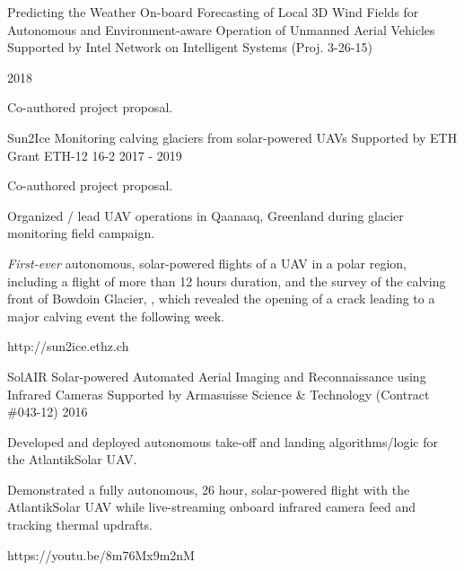 \begin{cventries}
  \cvprojwideentry
  	{Predicting the Weather} %
  	{On-board Forecasting of Local 3D Wind Fields for Autonomous and
Environment-aware Operation of Unmanned Aerial Vehicles} %
    {Supported by Intel Network on Intelligent Systems (Proj. 3-26-15)} %
    {\parbox{\linewidth}{2018\linebreak}} %
    {
      \begin{cvitems} %
        \item {Co-authored project proposal.}
      \end{cvitems}
    } %
    {} %
    {\showprojectdescriptions}
    {}

\vspace{-9pt}

  \cvprojwideentry
  	{Sun2Ice} %
  	{Monitoring calving glaciers from solar-powered UAVs} %
    {Supported by ETH Grant ETH-12 16-2} %
    {2017 - 2019} %
    {
      \begin{cvitems} %
        \item {Co-authored project proposal.}
        \item {Organized / lead UAV operations in Qaanaaq, Greenland during glacier monitoring field campaign.}
        \item {\emph{First-ever} autonomous, solar-powered flights of a UAV in a polar region, including a flight of more than 12 hours duration, and the survey of the calving front of Bowdoin Glacier, , which revealed the opening of a crack leading to a major calving event the following week.}
      \end{cvitems}
    } %
    {http://sun2ice.ethz.ch} %
    {\showprojectdescriptions}
    {}
    
\cvprojwideentry
  	{SolAIR} %
  	{Solar-powered Automated Aerial Imaging and Reconnaissance using Infrared Cameras} %
    {Supported by Armasuisse Science \& Technology (Contract \#043-12)} %
    {2016} %
    {
      \begin{cvitems} %
        \item {Developed and deployed autonomous take-off and landing algorithms/logic for the AtlantikSolar UAV.}
        \item {Demonstrated a fully autonomous, 26 hour, solar-powered flight with the AtlantikSolar UAV while live-streaming onboard infrared camera feed and tracking thermal updrafts.}
      \end{cvitems}
    } %
    {https://youtu.be/8m76Mx9m2nM} %
    {\showprojectdescriptions}
    {}
    

\end{cventries}
